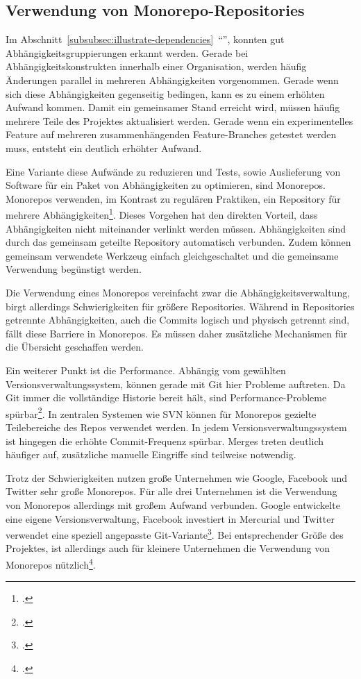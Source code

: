 \subsection{Verwendung von Monorepo-Repositories}

Im Abschnitt~\ref{subsubsec:illustrate-dependencies}~``'', konnten gut Abhängigkeitsgruppierungen erkannt werden. Gerade bei Abhängigkeitskonstrukten innerhalb einer Organisation, werden häufig Änderungen parallel in mehreren Abhängigkeiten vorgenommen. Gerade wenn sich diese Abhängigkeiten gegenseitig bedingen, kann es zu einem erhöhten Aufwand kommen. Damit ein gemeinsamer Stand erreicht wird, müssen häufig mehrere Teile des Projektes aktualisiert werden. Gerade wenn ein experimentelles Feature auf mehreren zusammenhängenden Feature-Branches getestet werden muss, entsteht ein deutlich erhöhter Aufwand.

Eine Variante diese Aufwände zu reduzieren und Tests, sowie Auslieferung von Software für ein Paket von Abhängigkeiten zu optimieren, sind Monorepos. Monorepos verwenden, im Kontrast zu regulären Praktiken, ein Repository für mehrere Abhängigkeiten\footcite{trunkbaseddevelopment-monorepo}. Dieses Vorgehen hat den direkten Vorteil, dass Abhängigkeiten nicht miteinander verlinkt werden müssen. Abhängigkeiten sind durch das gemeinsam geteilte Repository automatisch verbunden. Zudem können gemeinsam verwendete Werkzeug einfach gleichgeschaltet und die gemeinsame Verwendung begünstigt werden.

Die Verwendung eines Monorepos vereinfacht zwar die Abhängigkeitsverwaltung, birgt allerdings Schwierigkeiten für größere Repositories. Während in Repositories getrennte Abhängigkeiten, auch die Commits logisch und physisch getrennt sind, fällt diese Barriere in Monorepos. Es müssen daher zusätzliche Mechanismen für die Übersicht geschaffen werden.

Ein weiterer Punkt ist die Performance. Abhängig vom gewählten Versionsverwaltungssystem, können gerade mit Git hier Probleme auftreten. Da Git immer die vollständige Historie bereit hält, sind Performance-Probleme spürbar\footcite{atlassian-monorepo-git}. In zentralen Systemen wie SVN können für Monorepos gezielte Teilebereiche des Repos verwendet werden. 
In jedem Versionsverwaltungssystem ist hingegen die erhöhte Commit-Frequenz spürbar. Merges treten deutlich häufiger auf, zusätzliche manuelle Eingriffe sind teilweise notwendig.

Trotz der Schwierigkeiten nutzen große Unternehmen wie Google, Facebook und Twitter sehr große Monorepos. Für alle drei Unternehmen ist die Verwendung von Monorepos allerdings mit großem Aufwand verbunden. Google entwickelte eine eigene Versionsverwaltung, Facebook investiert in Mercurial und Twitter verwendet eine speziell angepasste Git-Variante\footcite{monorepos-wild}.
Bei entsprechender Größe des Projektes, ist allerdings auch für kleinere Unternehmen die Verwendung von Monorepos nützlich\footcite{hackernoon-positive-monorepo}.

